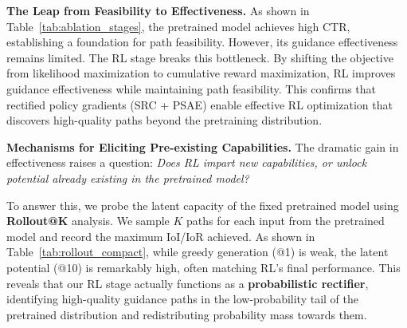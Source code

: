\textbf{The Leap from Feasibility to Effectiveness.} 
As shown in Table~\ref{tab:ablation_stages}, the pretrained model achieves high CTR, establishing a foundation for path feasibility. However, its guidance effectiveness remains limited. The RL stage breaks this bottleneck. By shifting the objective from likelihood maximization to cumulative reward maximization, RL improves guidance effectiveness while maintaining path feasibility. This confirms that rectified policy gradients (SRC + PSAE) enable effective RL optimization that discovers high-quality paths beyond the pretraining distribution.

\textbf{Mechanisms for Eliciting Pre-existing Capabilities.} 
The dramatic gain in effectiveness raises a question: \textit{Does RL impart new capabilities, or unlock potential already existing in the pretrained model?}

To answer this, we probe the latent capacity of the fixed pretrained model using \textbf{Rollout@K} analysis. We sample $K$ paths for each input from the pretrained model and record the maximum IoI/IoR achieved. As shown in Table~\ref{tab:rollout_compact}, while greedy generation (@1) is weak, the latent potential (@10) is remarkably high, often matching RL's final performance. This reveals that our RL stage actually functions as a \textbf{probabilistic rectifier}, identifying high-quality guidance paths in the low-probability tail of the pretrained distribution and redistributing probability mass towards them.